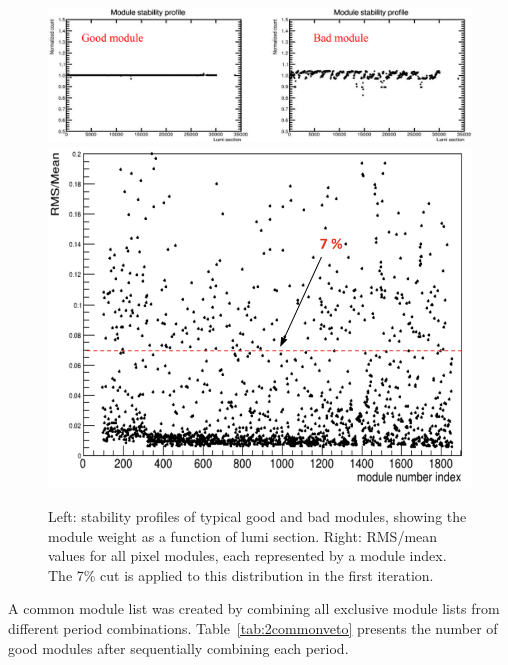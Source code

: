 \begin{center} \begin{figure}[h!] 
\centering 
\includegraphics[scale=.17]{Chapter4/good_module.png}
\includegraphics[scale=.15]{Chapter4/RMSmean.png} 
\caption[Profile of good and bad modules stability and module cut of 7\%]{Left: stability profiles of typical good and bad modules, showing the module weight as a function of lumi section. Right: RMS/mean values for all pixel modules, each represented by a module index. The 7\% cut is applied to this distribution in the first iteration.} \label{goodmodule} \end{figure} \end{center}


A common module list was created by combining all exclusive module lists from different period combinations. Table~\ref{tab:2commonveto} presents the number of good modules after sequentially combining each period.

